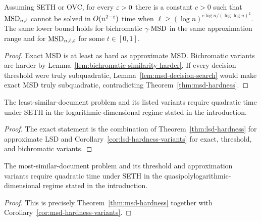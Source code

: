 \begin{corollary}
  \label{cor:msd-hardness-variants}
  Assuming SETH or OVC, for every $\varepsilon>0$ there is a constant $c>0$ such that
  $\mathrm{MSD}_{n,\ell}$ cannot be solved in $O(n^{2-\varepsilon})$ time when
  $\ell\geq(\log n)^{c\log n/(\log\log n)^2}$.  The same lower bound holds for
  bichromatic $\gamma$-$\mathrm{MSD}$ in the same approximation range and for
  $\mathrm{MSD}_{n,\ell,t}$ for some $t\in[0,1]$.
\end{corollary}
\begin{proof}
  Exact MSD is at least as hard as approximate MSD.  Bichromatic variants are
  harder by Lemma~\ref{lem:bichromatic-similarity-harder}.  If every decision
  threshold were truly subquadratic, Lemma~\ref{lem:msd-decision-search} would
  make exact MSD truly subquadratic, contradicting
  Theorem~\ref{thm:msd-hardness}.
\end{proof}

\begin{theorem}
  \label{thm:intro-lsd-hardness}
  The least-similar-document problem and its listed variants require quadratic
  time under SETH in the logarithmic-dimensional regime stated in the
  introduction.
\end{theorem}
\begin{proof}
  The exact statement is the combination of Theorem~\ref{thm:lsd-hardness} for
  approximate LSD and Corollary~\ref{cor:lsd-hardness-variants} for exact,
  threshold, and bichromatic variants.
\end{proof}

\begin{theorem}
  \label{thm:intro-msd-hardness}
  The most-similar-document problem and its threshold and approximation variants
  require quadratic time under SETH in the quasipolylogarithmic-dimensional
  regime stated in the introduction.
\end{theorem}
\begin{proof}
  This is precisely Theorem~\ref{thm:msd-hardness} together with
  Corollary~\ref{cor:msd-hardness-variants}.
\end{proof}

